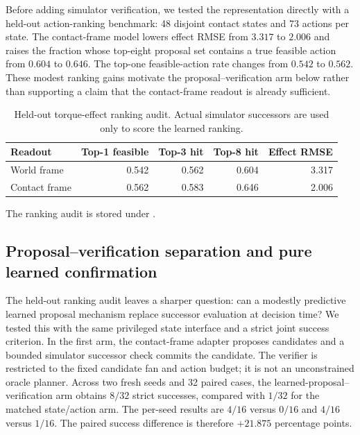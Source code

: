 \documentclass{article}
\begin{document}
Before adding simulator verification, we tested the representation directly
with a held-out action-ranking benchmark: 48 disjoint contact states and 73
actions per state.  The contact-frame model lowers effect RMSE from $3.317$ to
$2.006$ and raises the fraction whose top-eight proposal set contains a true
feasible action from $0.604$ to $0.646$.  The top-one feasible-action rate
changes from $0.542$ to $0.562$.  These modest ranking gains motivate the
proposal--verification arm below rather than supporting a claim that the
contact-frame readout is already sufficient.

\begin{table}[H]
\centering
\scriptsize
\setlength{\tabcolsep}{4pt}
\caption{Held-out torque-effect ranking audit. Actual simulator successors
are used only to score the learned ranking.}
\label{tab:supp-torque-ranking}
\begin{tabular}{lrrrr}
\toprule
Readout & Top-1 feasible & Top-3 hit & Top-8 hit & Effect RMSE \\
\midrule
World frame & 0.542 & 0.562 & 0.604 & 3.317 \\
Contact frame & 0.562 & 0.583 & 0.646 & 2.006 \\
\bottomrule
\end{tabular}
\end{table}

The ranking audit is stored under
.

\subsection{Proposal--verification separation and pure learned confirmation}
\label{sec:supp-proposal-verification-separation}

The held-out ranking audit leaves a sharper question: can a modestly
predictive learned proposal mechanism replace successor evaluation at
decision time?  We tested this with the same privileged state interface and a
strict joint success criterion.  In the first arm, the contact-frame adapter
proposes candidates and a bounded simulator successor check commits the
candidate.  The verifier is restricted to the fixed candidate fan and action
budget; it is not an unconstrained oracle planner.  Across two fresh seeds
and 32 paired cases, the learned-proposal--verification arm obtains $8/32$
strict successes, compared with $1/32$ for the matched state/action arm.
The per-seed results are $4/16$ versus $0/16$ and $4/16$ versus $1/16$.
The paired success difference is therefore $+21.875$ percentage points.
\end{document}
